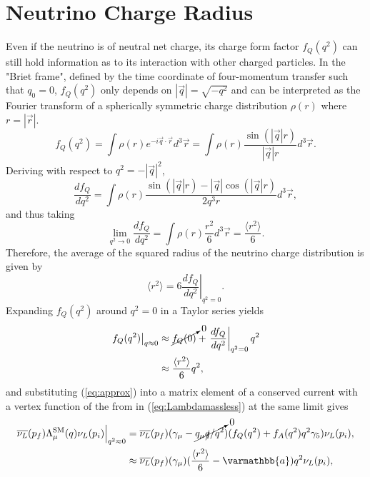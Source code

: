 \section{Neutrino Charge Radius}
Even if the neutrino is of neutral net charge, its charge form factor $f_Q({q^2})$ can still hold information as to its interaction with other charged particles. In the "Briet frame", defined by the time coordinate of four-momentum transfer such that $q_0 = 0$, $f_Q({q^2})$ only depends on $|\vec{q}| = \sqrt{-q^2}$ and can be interpreted as the Fourier transform of a spherically symmetric charge distribution $\rho(r)$ where $r=|\vec{r}|$.
\begin{equation}
	f_Q(q^2) = \int \rho(r) e^{-i\vec{q} \cdot \vec{r}} d^3 \vec{r} = \int \rho(r) \frac{\sin(|\vec{q}|r)}{|\vec{q}|r}d^3 \vec{r}.
\end{equation}
Deriving with respect to $q^2 = -|\vec{q}|^2$,
\begin{equation}
\dfrac{d f_Q}{dq^2}	= \int \rho(r) \dfrac{\sin(|\vec{q}|r) - |\vec{q}|\cos(|\vec{q}|r)}{2q^3r} d^3\vec{r},
\end{equation}
and thus taking
\begin{equation}
	\lim_{q^2 \rightarrow 0} \dfrac{d f_Q}{dq^2} = \int \rho(r) \frac{r^2}{6} d^3\vec{r} = \frac{\langle r^2 \rangle}{6}.
\end{equation}
Therefore, the average of the squared radius of the neutrino charge distribution is given by
\begin{equation}\label{eq:NRCfinal}
	\langle r^2 \rangle = 6 \left. \dfrac{d f_Q}{dq^2} \right|_{q^2 = 0}.
\end{equation}
Expanding $f_Q(q^2)$ around $q^2 = 0$ in a Taylor series yields
\begin{align}\nonumber
	\left. f_Q(q^2) \right|_{q \approx 0} &\approx \cancelto{0}{f_Q(0)} + \left. \dfrac{d f_Q}{dq^2} \right|_{q^2 = 0}q^2\\ \label{eq:approx}
										 &\approx \frac{\langle r^2 \rangle}{6}q^2,
\end{align}
and substituting (\ref{eq:approx}) into a matrix element of a conserved current with a vertex function of the from in (\ref{eq:Lambdamassless}) at the same limit gives
\begin{align}\nonumber
	\overline{\nu_L}(p_f)\Lambda^{\text{SM}}_\mu(q)\nu_L(p_i)\Big|_{q^2\approx0} & = \overline{\nu_L}(p_f)(\gamma_\mu - \cancelto{0}{q_\mu \slashed{q}/q^2})(f_Q(q^2) + f_A(q^2)q^2\gamma_5)\nu_L(p_i),\\ \label{eq:approxformfac}
												 & \approx \overline{\nu_L}(p_f)(\gamma_\mu)(\frac{\langle r^2 \rangle}{6} - \varmathbb{a})q^2\nu_L(p_i),
\end{align}
